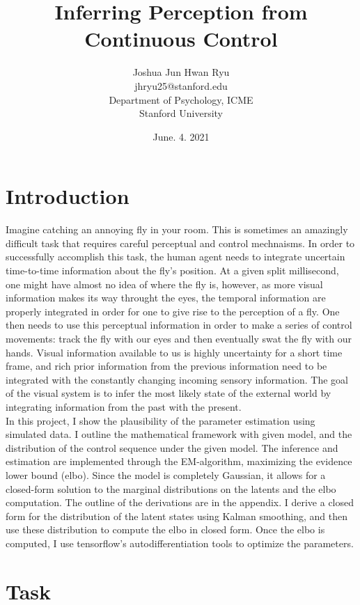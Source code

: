 \documentclass[11pt, reqno]{article}
\title{Inferring Perception from Continuous Control}
\author{Joshua Jun Hwan Ryu \\jhryu25@stanford.edu\\Department of Psychology, ICME \\ Stanford University}
\date{June. 4. 2021}
\numberwithin{equation}{section}
\begin{document}
\maketitle

\section{Introduction}

Imagine catching an annoying fly in your room. This is sometimes an amazingly difficult task that requires careful perceptual and control mechnaisms. In order to successfully accomplish this task, the human agent needs to integrate uncertain time-to-time information about the fly's position.  At a given split millisecond, one might have almost no idea of where the fly is, however, as more visual information makes its way throught the eyes, the temporal information are properly integrated in order for one to give rise to the perception of a fly.  One then needs to use this perceptual information in order to make a series of control movements: track the fly with our eyes and then eventually swat the fly with our hands.  Visual information available to us is highly uncertainty for a short time frame, and rich prior information from the previous information need to be integrated with the constantly changing incoming sensory information.  The goal of the visual system is to infer the most likely state of the external world by integrating information from the past with the present.  \\

In this project,  I show the plausibility of the parameter estimation using simulated data.  I outline the mathematical framework with given model, and the distribution of the control sequence under the given model.  The inference and estimation are implemented through the EM-algorithm,  maximizing the evidence lower bound (elbo).  Since the model is completely Gaussian, it allows for a closed-form solution to the marginal distributions on the latents and the elbo computation.  The outline of the derivations are in the appendix.  I derive a closed form for the distribution of the latent states using Kalman smoothing,  and then use these distribution to compute the elbo in closed form.  Once the elbo is computed,  I use tensorflow's autodifferentiation tools to optimize the parameters.  

\section{Task}
\end{document}
